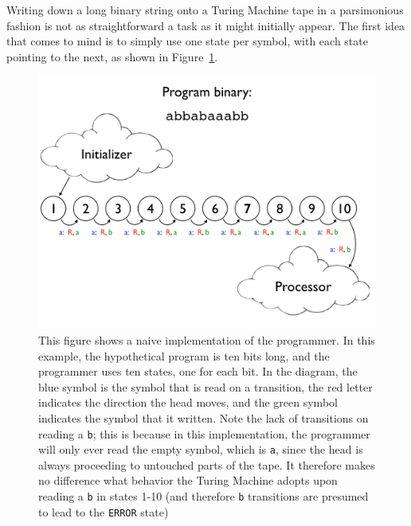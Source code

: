 \documentclass[11pt]{article}
\begin{document}
Writing down a long binary string onto a Turing Machine tape in a parsimonious fashion is not as straightforward a task as it might initially appear. The first idea that comes to mind is to simply use one state per symbol, with each state pointing to the next, as shown in Figure~\ref{fig:naiveprog}. \\

\begin{figure}
\begin{center}
\includegraphics[scale=0.42]{figs/naiveprog.png}
\caption{This figure shows a naive implementation of the programmer. In this example, the hypothetical program is ten bits long, and the programmer uses ten states, one for each bit. In the diagram, the blue symbol is the symbol that is read on a transition, the red letter indicates the direction the head moves, and the green symbol indicates the symbol that it written. Note the lack of transitions on reading a \texttt{b}; this is because in this implementation, the programmer will only ever read the empty symbol, which is \texttt{a}, since the head is always proceeding to untouched parts of the tape. It therefore makes no difference what behavior the Turing Machine adopts upon reading a \texttt{b} in states 1-10 (and therefore \texttt{b} transitions are presumed to lead to the \texttt{ERROR} state) \label{fig:naiveprog}}
\end{center}
\end{figure}
\end{document}
